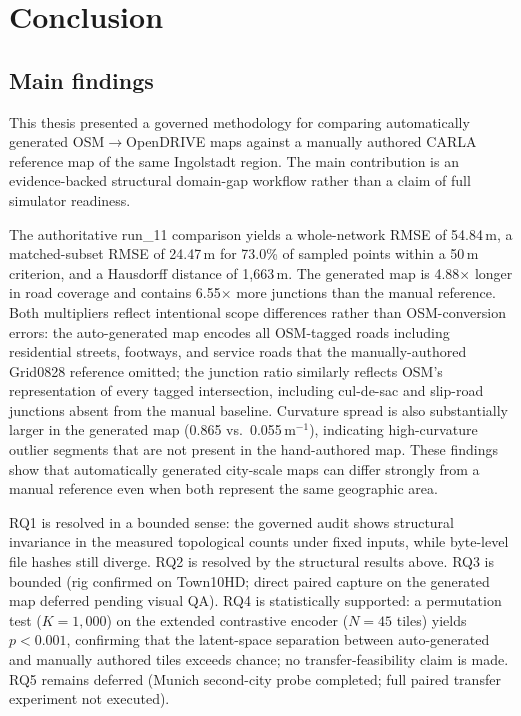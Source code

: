 \section{Conclusion}
\label{sec:conclusion}

\subsection{Main findings}
This thesis presented a governed methodology for comparing automatically generated OSM$\rightarrow$OpenDRIVE maps against a manually authored CARLA reference map of the same Ingolstadt region. The main contribution is an evidence-backed structural domain-gap workflow rather than a claim of full simulator readiness.

The authoritative run\_11 comparison yields a whole-network RMSE of 54.84\,m, a matched-subset RMSE of 24.47\,m for 73.0\% of sampled points within a 50\,m criterion, and a Hausdorff distance of 1{,}663\,m. The generated map is 4.88$\times$ longer in road coverage and contains 6.55$\times$ more junctions than the manual reference. Both multipliers reflect intentional scope differences rather than OSM-conversion errors: the auto-generated map encodes all OSM-tagged roads including residential streets, footways, and service roads that the manually-authored Grid0828 reference omitted; the junction ratio similarly reflects OSM's representation of every tagged intersection, including cul-de-sac and slip-road junctions absent from the manual baseline. Curvature spread is also substantially larger in the generated map (0.865 vs.\ 0.055\,m$^{-1}$), indicating high-curvature outlier segments that are not present in the hand-authored map. These findings show that automatically generated city-scale maps can differ strongly from a manual reference even when both represent the same geographic area.

RQ1 is resolved in a bounded sense: the governed audit shows structural invariance in the measured topological counts under fixed inputs, while byte-level file hashes still diverge. RQ2 is resolved by the structural results above. RQ3 is bounded (rig confirmed on Town10HD; direct paired capture on the generated map deferred pending visual QA). RQ4 is statistically supported: a permutation test ($K=1{,}000$) on the extended contrastive encoder ($N=45$ tiles) yields $p<0.001$, confirming that the latent-space separation between auto-generated and manually authored tiles exceeds chance; no transfer-feasibility claim is made. RQ5 remains deferred (Munich second-city probe completed; full paired transfer experiment not executed).

